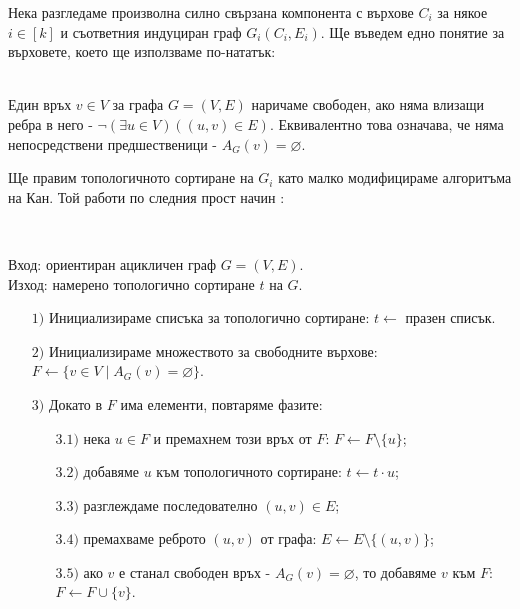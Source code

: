\documentclass[12pt,twoside,a4paper]{article}
\begin{document}
	Нека разгледаме произволна силно свързана компонента с върхове $C_i$ за някое $i \in [k]$ и съответния индуциран граф $G_i(C_i, E_i)$. Ще въведем едно понятие за върховете, което ще използваме по-нататък:
	
	\begin{definition}\label{def:free-v}~\\
		\indent Един връх $v \in V$ за графа $G=(V,E)$ наричаме свободен, ако няма влизащи ребра в него - $\lnot(\exists u \in V)((u,v) \in E)$. Еквивалентно това означава, че няма непосредствени предшественици - $A_G(v) = \varnothing$.
	\end{definition}
	
	Ще правим топологичното сортиране на $G_i$ като малко модифицираме алгоритъма на Кан. Той работи по следния прост начин \cite{kahn}:
	
	\begin{algorithm}\label{algo:kahn}~
		
		Вход: ориентиран ацикличен граф $G=(V,E)$.\\
		\indent Изход: намерено топологично сортиране $t$ на $G$.
		
		\begin{itemize}
			\item[$1)$] Инициализираме списъка за топологично сортиране: $t \gets$ празен списък.
			\item[$2)$] Инициализираме множеството за свободните върхове: $F \gets \{v \in V \mid A_G(v) = \varnothing\}$.
			\item[$3)$] Докато в $F$ има елементи, повтаряме фазите:
			\begin{itemize}
				\item[$3.1)$] нека $u \in F$ и премахнем този връх от $F$: $F \gets F \setminus \{u\}$;
				\item[$3.2)$] добавяме $u$ към топологичното сортиране: $t \gets t \cdot u$;
				\item[$3.3)$] разглеждаме последователно $(u,v) \in E$;
				\item[$3.4)$] премахваме реброто $(u,v)$ от графа: $E \gets E \setminus \{(u,v)\}$;
				\item[$3.5)$] ако $v$ е станал свободен връх - $A_G(v) = \varnothing$, то добавяме $v$ към $F$: $F \gets F \cup \{v\}$.
			\end{itemize}
		\end{itemize}
	\end{algorithm}
	
\end{document}
